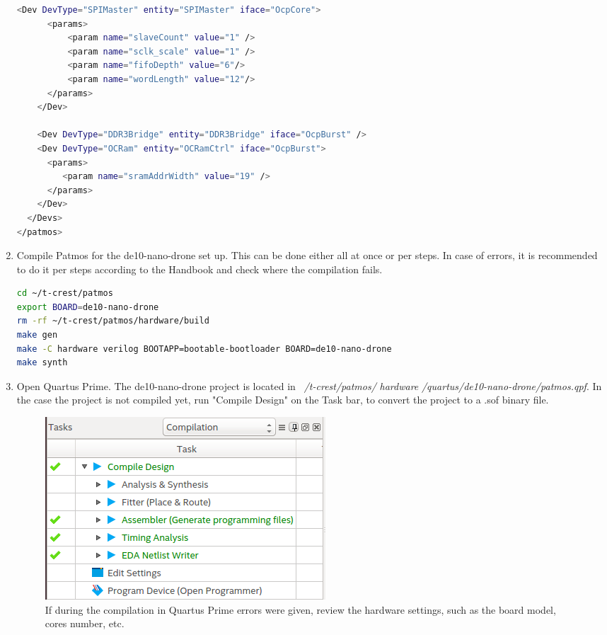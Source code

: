 \begin{enumerate}
\begin{lstlisting}[language=bash]
    <Dev DevType="SPIMaster" entity="SPIMaster" iface="OcpCore">
      <params>
          <param name="slaveCount" value="1" />
          <param name="sclk_scale" value="1" /> 
          <param name="fifoDepth" value="6"/>
          <param name="wordLength" value="12"/>
      </params>
    </Dev>

    <Dev DevType="DDR3Bridge" entity="DDR3Bridge" iface="OcpBurst" />
    <Dev DevType="OCRam" entity="OCRamCtrl" iface="OcpBurst">
      <params>
         <param name="sramAddrWidth" value="19" />
      </params>
    </Dev>
  </Devs>
</patmos>
\end{lstlisting}
    
    \item Compile Patmos for the de10-nano-drone set up. This can be done either all at once or per steps. In case of errors, it is recommended to do it per steps according to the Handbook\cite{bib:patmos_hnd} and check where the compilation fails.

\lstset{style=Bstyle}
\begin{lstlisting}[language=bash]
cd ~/t-crest/patmos
export BOARD=de10-nano-drone
rm -rf ~/t-crest/patmos/hardware/build
make gen
make -C hardware verilog BOOTAPP=bootable-bootloader BOARD=de10-nano-drone
make synth
\end{lstlisting} 
    
    \item Open Quartus Prime. The de10-nano-drone project is located in \textit{~/t-crest/patmos/} \textit{hardware} \textit{/quartus/de10-nano-drone/patmos.qpf}. In the case the project is not compiled yet, run "Compile Design" on the Task bar, to convert the project to a .sof binary file. 

\begin{figure}[H]
    \centering
        \includegraphics[scale=0.5]{Figures/setup/quatus_compile.png}
    \caption{If during the compilation in Quartus Prime errors were given, review the hardware settings, such as the board model, cores number, etc.}
\end{figure}


\end{enumerate}
